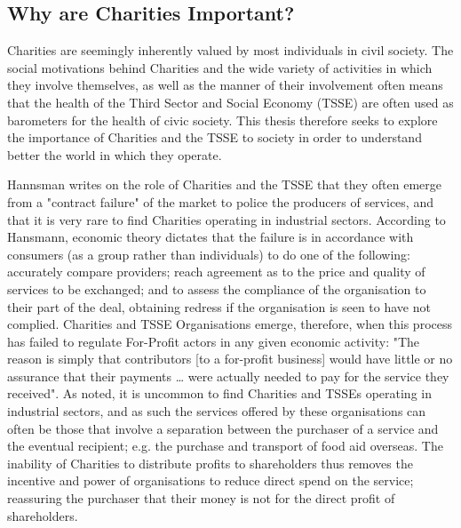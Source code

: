 \subsection{Why are Charities Important?}
Charities are seemingly inherently valued by most individuals in civil society. The social motivations behind Charities and the wide variety of activities in which they involve themselves, as well as the manner of their involvement often means that the health of the Third Sector and Social Economy (TSSE) are often used as barometers for the health of civic society. This thesis therefore seeks to explore the importance of Charities and the TSSE to society in order to understand better the world in which they operate.

Hannsman writes on the role of Charities and the TSSE that they often emerge from a "contract failure" of the market to police the producers of services, and that it is very rare to find Charities operating in industrial sectors. According to Hansmann, economic theory dictates that the failure is in accordance with consumers (as a group rather than individuals) to do one of the following: accurately compare providers; reach agreement  as to the price and quality of services to be exchanged; and to assess the compliance of the organisation to their part of the deal, obtaining redress if the organisation is seen to have not complied. Charities and TSSE Organisations emerge, therefore, when this process has failed to regulate For-Profit actors in any given economic activity: "The reason is simply that contributors [to a for-profit business] would  have little or no assurance that their payments … were actually needed to pay for the service they received". As noted, it is uncommon to find Charities and TSSEs operating in industrial sectors, and as such the services offered by these organisations can often be those that involve a separation between the purchaser of a service and the eventual recipient; e.g. the purchase and transport of food aid overseas. The inability of Charities to distribute profits to shareholders thus removes the incentive and power of organisations to reduce direct spend on the service; reassuring the purchaser that their money is not for the direct profit of shareholders.

